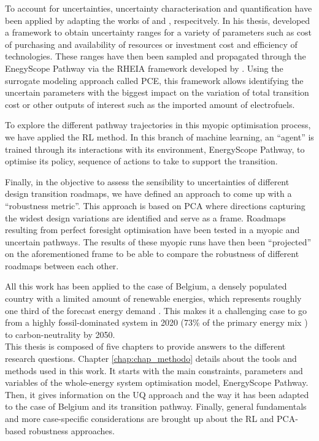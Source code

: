 To account for uncertainties, uncertainty characterisation and quantification have been applied by adapting the works of \citet{Moret2017PhDThesis} and \citet{coppittersthesis}, respecitvely. In his thesis, \citet{Moret2017PhDThesis} developed a framework to obtain uncertainty ranges for a variety of parameters such as cost of purchasing and availability of resources or investment cost and efficiency of technologies. These ranges have then been sampled and propagated through the EnegyScope Pathway via the RHEIA framework developed by \citet{coppittersthesis}. Using the surrogate modeling approach called \gls{PCE}, this framework allows identifying the uncertain parameters with the biggest impact on the variation of total transition cost or other outputs of interest such as the imported amount of electrofuels. 

To explore the different pathway trajectories in this myopic optimisation process, we have applied the \gls{RL} method. In this branch of machine learning, an ``agent'' is trained through its interactions with its environment, EnergyScope Pathway, to optimise its policy, \ie sequence of actions to take to support the transition. 

Finally, in the objective to assess the sensibility to uncertainties of different design transition roadmaps, we have defined an approach to come up with a ``robustness metric''. This approach is based on \gls{PCA} where directions capturing the widest design variations are identified and serve as a frame. Roadmaps resulting from perfect foresight optimisation have been tested in a myopic and uncertain pathways. The results of these myopic runs have then been ``projected'' on the aforementioned frame to be able to compare the robustness of different roadmaps between each other.

All this work has been applied to the case of Belgium, a densely populated country with a limited amount of renewable energies, which represents roughly one third of the forecast energy demand \cite{Limpens2020}. This makes it a challenging case to go from a highly fossil-dominated system in 2020 (73\% of the primary energy mix \cite{spf_economy_2022}) to carbon-neutrality by 2050.\\

\noindent
This thesis is composed of five chapters to provide answers to the different research questions. Chapter \ref{chap:chap_methodo} details about the tools and methods used in this work. It starts with the main constraints, parameters and variables of the whole-energy system optimisation model, EnergyScope Pathway. Then, it gives information on the \gls{UQ} approach and the way it has been adapted to the case of Belgium and its transition pathway. Finally, general fundamentals and more case-specific considerations are brought up about the \gls{RL} and \gls{PCA}-based robustness approaches.


